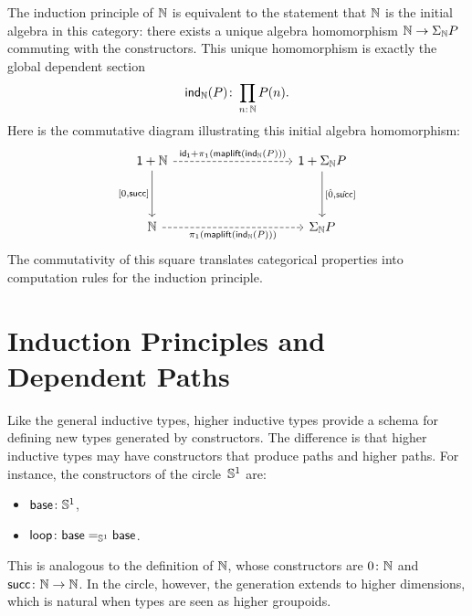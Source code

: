 \begin{xmpl}
    The induction principle of $\mathbb{N}$ is equivalent to the statement that $\mathbb{N}$ is the initial algebra in this category: there exists a unique algebra homomorphism $\mathbb{N}\to\Sigma_{\mathbb{N}} P$ commuting with the constructors. This unique homomorphism is exactly the global dependent section
    \[
        \fun{ind}_\N(P)\colon\prod_{n\colon\N}P(n).
    \]
    Here is the commutative diagram illustrating this initial algebra homomorphism:
    \[
        \begin{tikzcd}[column sep=3.3cm,row sep=huge]
            \fun1+\N
                    \arrow[d,"{[0,\fun{succ}]}"']
                    \arrow[r,
                        "{
                            \id_{\fun1}+
                                \pi_1(
                                    \fun{maplift}(
                                        \fun{ind}_\N(P)
                                    )
                                )
                        }",
                        dashed]
                &\fun1+\Sigma_\N P
                    \arrow[d,"{[\hat{0},\hat{\fun{succ}}]}"]\\
            \N
                    \arrow[r,
                        "{\pi_1(\fun{maplift}(\fun{ind}_\N(P)))}"', dashed]
                &\Sigma_\N P
        \end{tikzcd}
    \]
    The commutativity of this square translates categorical properties into computation rules for the induction principle.
\end{xmpl}

\section{Induction Principles and Dependent Paths}

Like the general inductive types, higher inductive types provide a schema for defining new types generated by constructors. The difference is that higher inductive types may have constructors that produce paths and higher paths. For instance, the constructors of the circle~$\mathbb S^1$ are:
\begin{itemize}
    \item $\fun{base}\colon\sphere^1$,
    \item $\fun{loop}\colon\fun{base}\eq{\sphere^1}\fun{base}$.
\end{itemize}
This is analogous to the definition of $\mathbb{N}$, whose constructors are $0\colon\N$ and $\fun{succ}\colon\N\to\N$. In the circle, however, the generation extends to higher dimensions, which is natural when types are seen as higher groupoids.

